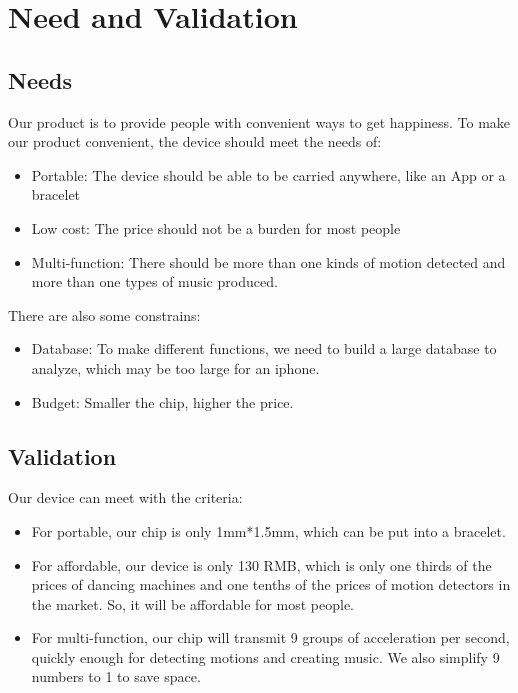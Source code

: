 \section{Need and Validation}

\subsection{Needs}

 Our product is to provide people with convenient ways to get happiness.
 To make our product convenient, the device should meet the needs of:

\begin{itemize}
\item Portable: The device should be able to be carried anywhere, like an App or
  a bracelet 
\item Low cost: The price should not be a burden for most people
\item Multi-function: There should be more than one kinds of motion detected and
  more than one types of music produced. 
\end{itemize}

 There are also some constrains:

\begin{itemize}
\item Database: To make different functions, we need to build a large database
  to analyze, which may be too large for an iphone. 
\item Budget: Smaller the chip, higher the price.
\end{itemize}

\subsection{Validation}

 Our device can meet with the criteria:

\begin{itemize}
\item For portable, our chip is only 1mm*1.5mm, which can be put into a
  bracelet. 
\item For affordable, our device is only 130 RMB, which is only one thirds of
  the prices of dancing machines and one tenths of the prices of motion
  detectors in the market.  So, it will be affordable for most people.  
\item For multi-function, our chip will transmit 9 groups of acceleration per
  second, quickly enough for detecting motions and creating music. We also
  simplify 9 numbers to 1 to save space. 
\end{itemize}

